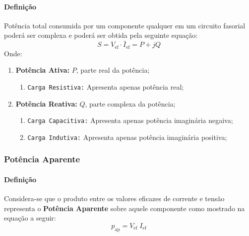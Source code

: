 \documentclass{article}
\begin{document}
            \paragraph{Definição}Potência total consumida por um componente qualquer em um circuito fasorial poderá ser complexa e poderá ser obtida pela seguinte equação:
                \begin{equation}
                    \boxed{
                        S = V_{\text{ef}} \cdot \bar{I}_{\text{ef}} = P + jQ
                    }
                \end{equation}
            Onde:
                \begin{enumerate}
                    \item \textbf{Potência Ativa:} $P$, parte real da potência;
                        \begin{enumerate}[noitemsep]
                            \item \texttt{Carga Resistiva:} Apresenta apenas potência real;
                        \end{enumerate}

                    \item \textbf{Potência Reativa:} $Q$, parte complexa da potência;
                        \begin{enumerate}[noitemsep]
                            \item \texttt{Carga Capacitiva:} Apresenta apenas potência imaginária negaiva;
                            \item \texttt{Carga Indutiva:} Apresenta apenas potência imaginária positiva;
                        \end{enumerate}
                \end{enumerate}

        \subsubsection{Potência Aparente}
            \paragraph{Definição}Considera-se que o produto entre os valores eficazes de corrente e tensão representa o \textbf{Potência Aparente} sobre aquele componente como mostrado na equação a seguir:
                \begin{equation}
                    \boxed{p_{\text{ap}} = V_{\text{ef}}\;I_{\text{ef}}}
                \end{equation}
\end{document}
